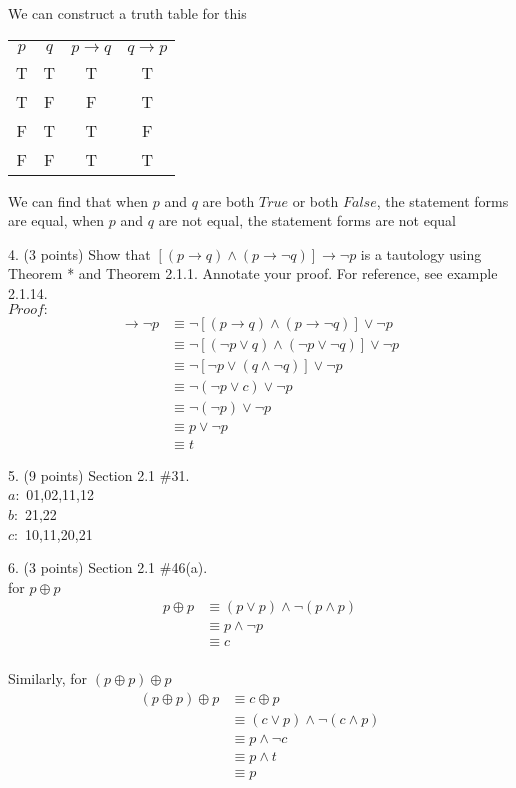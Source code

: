 \documentclass{article}
\begin{document}
We can construct a truth table for this
\begin{center}
    \begin{tabular}{c|c|c|c}
        $p$ & $q$ & $p \rightarrow q$ & $q \rightarrow p$  \\
         T & T & T & T \\
         T & F & F & T \\
         F & T & T & F \\
         F & F & T & T
    \end{tabular}
\end{center}
We can find that when $p$ and $q$ are both $True$ or both $False$, the statement forms are equal, when $p$ and $q$ are not equal, the statement forms are not equal
 
4. (3 points) Show that $[(p \rightarrow q) \wedge(p \rightarrow \neg q)] \rightarrow \neg p$ is a tautology using Theorem * and Theorem 2.1.1. Annotate your proof. For reference, see example 2.1.14.\\
$Proof:$
\begin{align}
    [(p \rightarrow q) \wedge (p \rightarrow \neg q)] \rightarrow \neg p &\equiv 
    \neg [(p \rightarrow q) \wedge (p \rightarrow \neg q)] \vee \neg p \tag{by Theorem *}\\
    &\equiv \neg[(\neg p \vee q) \wedge (\neg p \vee \neg q)] \vee \neg p \tag{by Theorem *}\\
    &\equiv \neg[\neg p \vee (q \wedge \neg q)]\vee \neg p \tag{by Distributive Law}\\
    &\equiv \neg(\neg p \vee c) \vee \neg p \tag{by Negation Law}\\
    &\equiv \neg(\neg p) \vee \neg p \tag{by Universal Bound Law}\\
    &\equiv p \vee \neg p \tag{by Double Negative Law}\\
    &\equiv t \tag{by Negation Law}  
\end{align}


5. (9 points) Section 2.1 \#31.\\
$a: $ {01,02,11,12}\\
$b: $ {21,22}\\
$c: $ {10,11,20,21}

6. (3 points) Section 2.1 \#46(a).\\
for $p \oplus p$
\begin{align}
    p \oplus p &\equiv (p \vee p) \wedge \neg (p \wedge p)\\
    &\equiv p \wedge\neg p\\
    &\equiv c
\end{align}
\\Similarly, for $(p \oplus p) \oplus p$\\
\begin{align}
    (p \oplus p) \oplus p &\equiv c \oplus p\\
    &\equiv (c \vee p) \wedge \neg (c \wedge p)\\
    &\equiv p \wedge \neg c\\
    &\equiv p \wedge t\\
    &\equiv p
\end{align}
\end{document}
